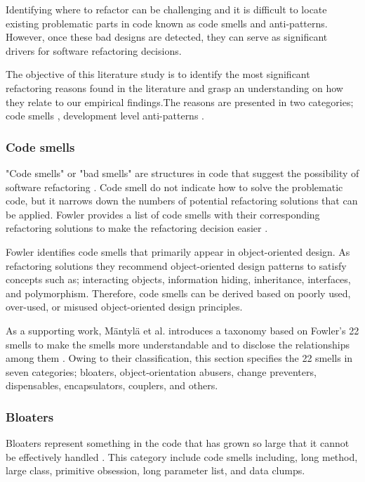Identifying where to refactor can be challenging and it is difficult to locate existing problematic parts in code known as code smells and anti-patterns. However, once these bad designs are detected, they can serve as significant drivers for software refactoring decisions. 

The objective of this literature study is to identify the most significant refactoring reasons found in the literature and grasp an understanding on how they relate to our empirical findings.The reasons are presented in two categories; code smells \cite{fowlerRefactor}, development level anti-patterns \cite{brownAntiPatterns}. 

\subsubsection{Code smells}
"Code smells" or "bad smells" are structures in code that suggest the possibility of software refactoring \cite{fowlerRefactor}. Code smell do not indicate how to solve the problematic code, but it narrows down the numbers of potential refactoring solutions that can be applied. Fowler provides a list of code smells with their corresponding refactoring solutions to make the refactoring decision easier \cite{fowlerRefactor}.

Fowler identifies code smells that primarily appear in object-oriented design. As refactoring solutions they recommend object-oriented design patterns to satisfy concepts such as; interacting objects, information hiding, inheritance, interfaces, and polymorphism. Therefore, code smells can be derived based on poorly used, over-used, or misused object-oriented design principles. 

As a supporting work, Mäntylä et al. introduces a taxonomy based on Fowler's 22 smells to make the smells more understandable and to disclose the relationships among them \cite{mantylaTaxonomy}. Owing to their classification, this section specifies the 22 smells in seven categories; bloaters, object-orientation abusers, change preventers, dispensables, encapsulators, couplers, and others. 

\subsubsection*{Bloaters}
Bloaters represent something in the code that has grown so large that it cannot be effectively handled \cite{mantylaTaxonomy}. This category include code smells including, long method, large class, primitive obsession, long parameter list, and data clumps.

